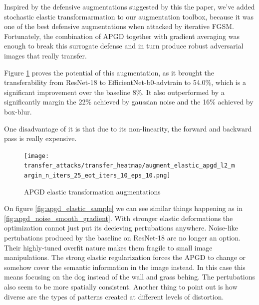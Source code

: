 Inspired by the defensive augmentations suggested by this the paper, we've added stochastic elastic transformarmation to our augmentation toolbox, because it was one of the best defensive augmentations when attacked by iterative FGSM. Fortunately, the combination of APGD together with gradient averaging was enough to break this surrogate defense and in turn produce robust adversarial images that really transfer.

Figure \ref{fig:apgd_elastic} proves the potential of this augmentation, as it brought the transferability from ResNet-18 to EfficientNet-b0-advtrain to 54.0\%, which is a significant improvement over the baseline 8\%. It also outperformed by a significantly margin the 22\% achieved by gaussian noise and the 16\% achieved by box-blur.

One disadvantage of it is that due to its non-linearity, the forward and backward pass is really expensive.


\begin{figure}
    \centering
    \texttt{[image: transfer\_attacks/transfer\_heatmap/augment\_elastic\_apgd\_l2\_margin\_n\_iters\_25\_eot\_iters\_10\_eps\_10.png]}
    \caption{APGD elastic transformation augmentations}
    \label{fig:apgd_elastic}
\end{figure}


On figure \ref{fig:apgd_elastic_sample} we can see similar things happening as in \ref{fig:apgd_noise_smooth_gradient}. With stronger elastic deformations the optimization cannot just put its decieving pertubations anywhere. Noise-like pertubations produced by the baseline on ResNet-18 are no longer an option. Their highly-tuned overfit nature makes them fragile to small image manipulations. The strong elastic regularization forces the APGD to change or somehow cover the semantic information in the image instead. In this case this means focusing on the dog instead of the wall and grass behing. The pertubations also seem to be more spatially consistent. Another thing to point out is how diverse are the types of patterns created at different levels of distortion.

